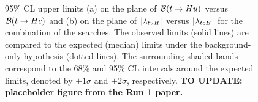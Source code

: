 \begin{figure}[htbp]
\begin{center}
\caption{\small {95\% CL upper limits (a) on the plane of $\mathcal{B}(t\to Hu)$ versus $\mathcal{B}(t\to Hc)$ and (b) on the plane 
of $|\lambda_{tuH}|$ versus $|\lambda_{tcH}|$ for the combination of the searches. The observed limits (solid lines) are compared to the expected (median) limits under the background-only hypothesis (dotted lines). The surrounding shaded bands correspond to the 68\% and 95\% CL intervals around the expected limits, 
denoted by $\pm 1\sigma$ and $\pm 2\sigma$, respectively.
\textbf{TO UPDATE: placeholder figure from the Run 1 paper.}}}
\label{fig:limits_combo_2D} 
\end{center}
\end{figure}

